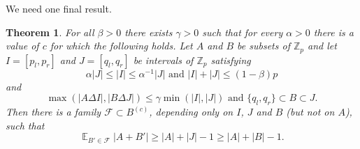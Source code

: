 \documentclass[12pt,reqno]{amsart}
\DeclareMathOperator*{\E}{\mathbb{E}}
\newtheorem{theorem}{Theorem}
\theoremstyle{definition}
\renewcommand\leq{\leqslant}
\renewcommand\geq{\geqslant}
\begin{document}
\vspace{5pt}
We need one final result.
\begin{theorem}\label{CD_technical}
  For all $\beta>0$ there exists $\gamma>0$ such that for every $\alpha>0$ there is a value of $c$ for which the
  following
  holds. Let $A$ and $B$ be subsets of $\mathbb{Z}_p$ and let  $I=[p_l, p_r]$ and $J=[q_l, q_r]$ be intervals  of $\mathbb{Z}_p$ satisfying
\begin{equation}\label{eq25.-2}
    \alpha |J| \leq |I| \leq \alpha^{-1} |J| \text{ and } |I|+|J|\leq (1-\beta)p
\end{equation}
and
\begin{equation}\label{eq25.-1}
    \max(|A\Delta I|, |B\Delta J|) \leq \gamma \min (|I|, |J|) \text{ and } \{q_l, q_r\} \subset B \subset J.
\end{equation}
Then there is a family $\mathcal{F}\subset B^{(c)}$, depending only on $I$, $J$ and $B$ (but not on $A$), such that
$$\E_{B'\in \mathcal{F}}|A+B'|\geq |A|+|J|-1 \geq |A|+|B|-1.$$
\end{theorem}
\end{document}
